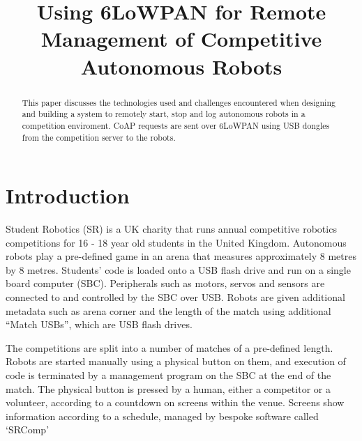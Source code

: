 \documentclass[conference]{IEEEtran}
\begin{document}
\title{Using 6LoWPAN for Remote Management of Competitive Autonomous Robots\\
}

\author{
}

\maketitle

\begin{abstract}
This paper discusses the technologies used and challenges encountered when designing and building a system to remotely start, stop and log autonomous robots in a competition enviroment.
CoAP requests are sent over 6LoWPAN using USB dongles from the competition server to the robots.
\end{abstract}


\section{Introduction}

Student Robotics (SR) is a UK charity that runs annual competitive robotics competitions for 16 - 18 year old students in the United Kingdom. Autonomous robots play a pre-defined game in an arena that measures approximately 8 metres by 8 metres. Students' code is loaded onto a USB flash drive and run on a single board computer (SBC). Peripherals such as motors, servos and sensors are connected to and controlled by the SBC over USB. Robots are given additional metadata such as arena corner and the length of the match using additional ``Match USBs'', which are USB flash drives.

The competitions are split into a number of matches of a pre-defined length. Robots are started manually using a physical button on them, and execution of code is terminated by a management program on the SBC at the end of the match. The physical button is pressed by a human, either a competitor or a volunteer, according to a countdown on screens within the venue. Screens show information according to a schedule, managed by bespoke software called `SRComp'
\end{document}
